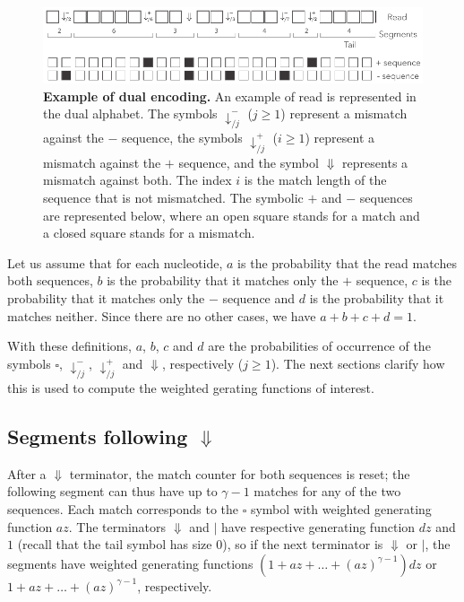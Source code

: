 \documentclass{article}
\begin{document}
\begin{figure}[h]
\centering
\includegraphics[scale=0.85]{sketch_dual.pdf}
\caption{\textbf{Example of dual encoding.}
An example of read is represented in the dual alphabet. The symbols
$\downarrow_{/j}^-$ ($j \geq 1$) represent a mismatch against the $-$
sequence, the symbols $\downarrow_{/j}^+$ ($i \geq 1$) represent a
mismatch against the $+$ sequence, and the symbol $\Downarrow$ represents
a mismatch against both. The index $i$ is the match length of the sequence
that is not mismatched. The symbolic $+$ and $-$ sequences are represented
below, where an open square stands for a match and a closed square stands
for a mismatch.}
\label{fig:dual}
\end{figure}

Let us assume that for each nucleotide, $a$ is the probability that the
read matches both sequences, $b$ is the probability that it matches only
the $+$ sequence, $c$ is the probability that it matches only the $-$
sequence and $d$ is the probability that it matches neither. Since there
are no other cases, we have $a+b+c+d=1$.

With these definitions, $a$, $b$, $c$ and $d$ are the probabilities of
occurrence of the symbols $\square$, $\downarrow_{/j}^-$,
$\downarrow_{/j}^+$ and $\Downarrow$, respectively ($j \geq 1$). The next
sections clarify how this is used to compute the weighted gerating
functions of interest.


\subsection{Segments following $\Downarrow$}

After a $\Downarrow$ terminator, the match counter for both sequences is
reset; the following segment can thus have up to $\gamma-1$ matches for
any of the two sequences. Each match corresponds to the $\square$ symbol
with weighted generating function $az$. The terminators $\Downarrow$ and
$|$ have respective generating function $dz$ and $1$ (recall that the tail
symbol has size 0), so if the next terminator is $\Downarrow$ or $|$, the
segments have weighted generating functions $(1 + az + \ldots +
(az)^{\gamma-1})dz$ or $1 + az + \ldots + (az)^{\gamma-1}$, respectively.
\end{document}
